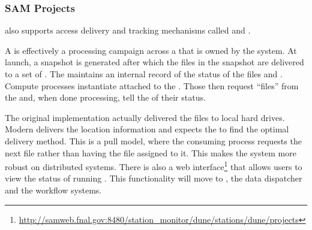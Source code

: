 \documentclass[../main-v1.tex]{subfiles}
\begin{document}

\subsubsection{SAM Projects}


 also supports access delivery and  tracking mechanisms called  and . 

A  is effectively a processing campaign across a  that is owned by the  system. At launch, a snapshot is generated after which the files in the snapshot are delivered to a set of .  The  maintains an internal record of the status of the files and . Compute processes instantiate  attached to the .  Those  then request ``files'' from the  and, when done processing, tell the  of their status.  

The original  implementation actually delivered the files to local hard drives.  Modern  delivers the location information and expects the  to find the optimal delivery method. This is a pull model, where the consuming process requests the next file rather than having the file assigned to it.  This makes the system more robust on distributed systems. 
There is also a web interface\footnote{\href{http://samweb.fnal.gov:8480/station_monitor/dune/stations/dune/projects}{http://samweb.fnal.gov:8480/station\_monitor/dune/stations/dune/projects}} that allows users to view the status of running . 
This functionality will move to , the data dispatcher and the workflow systems. 




\end{document}
